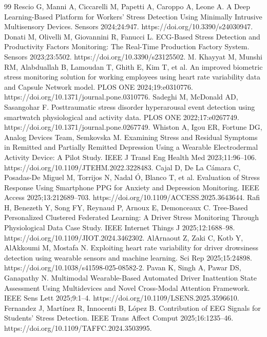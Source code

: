 \begin{thebibliography}{99}
\setlength{\itemsep}{1.5pt}\small
{} Rescio G, Manni A, Ciccarelli M, Papetti A, Caroppo A, Leone A. A Deep Learning-Based Platform for Workers’ Stress Detection Using Minimally Intrusive Multisensory Devices. Sensors 2024;24:947. https://doi.org/10.3390/s24030947.
 Donati M, Olivelli M, Giovannini R, Fanucci L. ECG-Based Stress Detection and Productivity Factors Monitoring: The Real-Time Production Factory System. Sensors 2023;23:5502. https://doi.org/10.3390/s23125502.
 M. Khayyat M, Munshi RM, Alabduallah B, Lamoudan T, Ghith E, Kim T, et al. An improved biometric stress monitoring solution for working employees using heart rate variability data and Capsule Network model. PLOS ONE 2024;19:e0310776. https://doi.org/10.1371/journal.pone.0310776.
 Sadeghi M, McDonald AD, Sasangohar F. Posttraumatic stress disorder hyperarousal event detection using smartwatch physiological and activity data. PLOS ONE 2022;17:e0267749. https://doi.org/10.1371/journal.pone.0267749.
 Whiston A, Igou ER, Fortune DG, Analog Devices Team, Semkovska M. Examining Stress and Residual Symptoms in Remitted and Partially Remitted Depression Using a Wearable Electrodermal Activity Device: A Pilot Study. IEEE J Transl Eng Health Med 2023;11:96--106. https://doi.org/10.1109/JTEHM.2022.3228483.
 Cajal D, De La Cámara C, Posadas-De Miguel M, Torrijos N, Nadal Ó, Blanco T, et al. Evaluation of Stress Response Using Smartphone PPG for Anxiety and Depression Monitoring. IEEE Access 2025;13:212689--703. https://doi.org/10.1109/ACCESS.2025.3643644.
 Rafi H, Benezeth Y, Song FY, Reynaud P, Arnoux E, Demonceaux C. Tree-Based Personalized Clustered Federated Learning: A Driver Stress Monitoring Through Physiological Data Case Study. IEEE Internet Things J 2025;12:1688--98. https://doi.org/10.1109/JIOT.2024.3462302.
 AlArnaout Z, Zaki C, Kotb Y, AlAkkoumi M, Mostafa N. Exploiting heart rate variability for driver drowsiness detection using wearable sensors and machine learning. Sci Rep 2025;15:24898. https://doi.org/10.1038/s41598-025-08582-2.
 Pavan K, Singh A, Pawar DS, Ganapathy N. Multimodal Wearable-Based Automated Driver Inattention State Assessment Using Multidevices and Novel Cross-Modal Attention Framework. IEEE Sens Lett 2025;9:1--4. https://doi.org/10.1109/LSENS.2025.3596610.
 Fernandez J, Martínez R, Innocenti B, López B. Contribution of EEG Signals for Students’ Stress Detection. IEEE Trans Affect Comput 2025;16:1235--46. https://doi.org/10.1109/TAFFC.2024.3503995.

\end{thebibliography}
